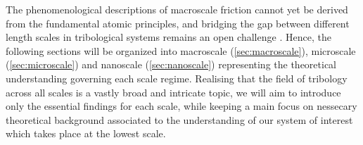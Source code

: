 The phenomenological descriptions of macroscale friction cannot yet be derived from the fundamental atomic principles, and bridging the gap between different length scales in tribological systems remains an open challenge \cite{Manini_2016}. Hence, the following sections will be organized into macroscale (\cref{sec:macroscale}), microscale (\cref{sec:microscale}) and nanoscale (\cref{sec:nanoscale}) representing the theoretical understanding governing each scale regime. Realising that the field of tribology across all scales is a vastly broad and intricate topic, we will aim to introduce only the essential findings for each scale, while keeping a main focus on nessecary theoretical background associated to the understanding of our system of interest which takes place at the lowest scale.












